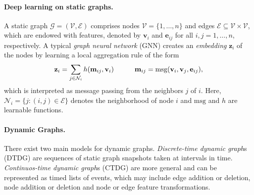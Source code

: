 \documentclass{article}
\begin{document}
\paragraph{Deep learning on static graphs.}
A static graph $\mathcal{G}=(\mathcal{V}, \mathcal{E})$ comprises nodes $\mathcal{V} = \{1, \hdots, n\}$ and edges $\mathcal{E} \subseteq \mathcal{V} \times \mathcal{V}$, which are endowed with features, denoted by $\mathbf{v}_i$ and $\mathbf{e}_{ij}$ for all $i,j = 1,\hdots, n$, respectively. 
A typical {\em graph neural network} (GNN) creates an {\em embedding} $\mathbf{z}_i$ of the nodes by learning a local aggregation rule of the form\vspace{-1mm}
$$
\mathbf{z}_i = \sum_{j \in \mathcal{N}_i} h(\mathbf{m}_{ij}, \mathbf{v}_i
) \quad\quad\quad \mathbf{m}_{ij} = \mathrm{msg}(\mathbf{v}_i,\mathbf{v}_j,\mathbf{e}_{ij}),
\vspace{-1mm}
$$
which is interpreted as message passing from the neighbors $j$ of $i$. 
Here, $\mathcal{N}_i = \{ j : (i,j) \in \mathcal{E} \}$ denotes the neighborhood of node $i$ and $\mathrm{msg}$ and $h$ are learnable functions.




\paragraph{Dynamic Graphs.}
There exist two main models for dynamic graphs. 
 \textit{Discrete-time dynamic graph}s (DTDG) are sequences of static graph snapshots taken at intervals in time. 
 {\em Continuos-time dynamic graph}s (CTDG) are more general and can be represented as timed lists of events, which may include edge addition or deletion, node addition or deletion and node or edge feature transformations. %
\end{document}
